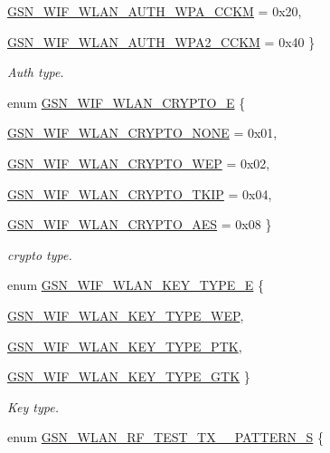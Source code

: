 \begin{DoxyCompactItemize}
\par
\hyperlink{a00640_gga2b3917a91d576d0d037c406e6397cab9aa0fa868074f7ff9aebd665edf070eb52}{GSN\_\-WIF\_\-WLAN\_\-AUTH\_\-WPA\_\-CCKM} =  0x20, 
\par
\hyperlink{a00640_gga2b3917a91d576d0d037c406e6397cab9a8bc51b5a7ed8ca4967f5ef955ab9f1a2}{GSN\_\-WIF\_\-WLAN\_\-AUTH\_\-WPA2\_\-CCKM} =  0x40
 \}
\begin{DoxyCompactList}\small\item\em Auth type. \end{DoxyCompactList}\item 
enum \hyperlink{a00677_ga49c8ff4188538f53965f3e0916f59746}{GSN\_\-WIF\_\-WLAN\_\-CRYPTO\_\-E} \{ \par
\hyperlink{a00640_gga49c8ff4188538f53965f3e0916f59746a5de19dc37abf26499707c12567818897}{GSN\_\-WIF\_\-WLAN\_\-CRYPTO\_\-NONE} =  0x01, 
\par
\hyperlink{a00640_gga49c8ff4188538f53965f3e0916f59746a74eebc9282a5ce051a677573ba6928eb}{GSN\_\-WIF\_\-WLAN\_\-CRYPTO\_\-WEP} =  0x02, 
\par
\hyperlink{a00640_gga49c8ff4188538f53965f3e0916f59746ae7316c7d6905e798ff24db647fe514b3}{GSN\_\-WIF\_\-WLAN\_\-CRYPTO\_\-TKIP} =  0x04, 
\par
\hyperlink{a00640_gga49c8ff4188538f53965f3e0916f59746afeb252a087410849b295f8b9e7c1a384}{GSN\_\-WIF\_\-WLAN\_\-CRYPTO\_\-AES} =  0x08
 \}
\begin{DoxyCompactList}\small\item\em crypto type. \end{DoxyCompactList}\item 
enum \hyperlink{a00677_ga738f68b803d29587618534b884d8b600}{GSN\_\-WIF\_\-WLAN\_\-KEY\_\-TYPE\_\-E} \{ \par
\hyperlink{a00640_gga738f68b803d29587618534b884d8b600af8dba2674fcae6ee49ea53e87e6b327c}{GSN\_\-WIF\_\-WLAN\_\-KEY\_\-TYPE\_\-WEP}, 
\par
\hyperlink{a00640_gga738f68b803d29587618534b884d8b600a384424192335ee263f6b9150bf61b80b}{GSN\_\-WIF\_\-WLAN\_\-KEY\_\-TYPE\_\-PTK}, 
\par
\hyperlink{a00640_gga738f68b803d29587618534b884d8b600aeb6b6a4473c3d874d150972fb22d0975}{GSN\_\-WIF\_\-WLAN\_\-KEY\_\-TYPE\_\-GTK}
 \}
\begin{DoxyCompactList}\small\item\em Key type. \end{DoxyCompactList}\item 
enum \hyperlink{a00677_ga651010efc8cff4e360fd72c7d32a70a9}{GSN\_\-WLAN\_\-RF\_\-TEST\_\-TX\_\_\-PATTERN\_\-S} \{ \par

\end{DoxyCompactItemize}
